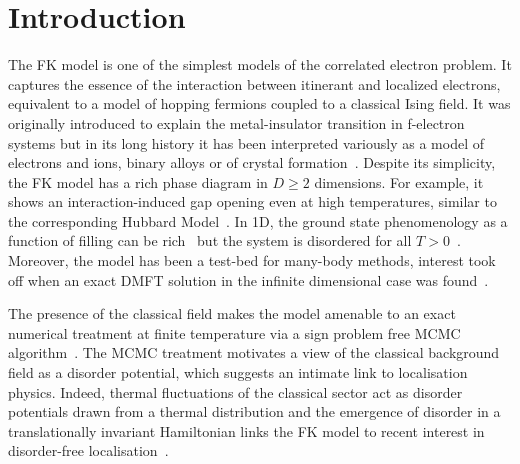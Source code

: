 \section{Introduction}
The \acl{FK} model is one of the simplest models of the correlated electron problem. It captures the essence of the interaction between itinerant and localized electrons, equivalent to a model of hopping fermions coupled to a classical Ising field. It was originally introduced to explain the metal-insulator transition in f-electron systems but in its long history it has been interpreted variously as a model of electrons and ions, binary alloys or of crystal formation~\cite{hubbardj.ElectronCorrelationsNarrow1963, falicovSimpleModelSemiconductorMetal1969,gruberFalicovKimballModelReview1996,gruberFalicovKimballModel2006}. Despite its simplicity, the \ac{FK} model has a rich phase diagram in \(D \geq 2\) dimensions. For example, it shows an interaction-induced gap opening even at high temperatures, similar to the corresponding Hubbard Model~\cite{brandtThermodynamicsCorrelationFunctions1989}.  In 1D, the ground state phenomenology as a function of filling can be rich~\cite{gruberGroundStatesSpinless1990} but the system is disordered for all \(T > 0\)~\cite{kennedyItinerantElectronModel1986}. Moreover, the model has been a test-bed for many-body methods, interest took off when an exact DMFT solution in the infinite dimensional case was found~\cite{antipovCriticalExponentsStrongly2014,ribicNonlocalCorrelationsSpectral2016,freericksExactDynamicalMeanfield2003,herrmannNonequilibriumDynamicalCluster2016}. 

The presence of the classical field makes the model amenable to an exact numerical treatment at finite temperature via a sign problem free \ac{MCMC} algorithm~\cite{devriesGapsDensitiesStates1993,devriesSimplifiedHubbardModel1993,antipovInteractionTunedAndersonMott2016,debskiPossibilityDetectionFinite2016,herrmannSpreadingCorrelationsFalicovKimball2018,maskaThermodynamicsTwodimensionalFalicovKimball2006}. The \ac{MCMC} treatment motivates a view of the classical background field as a disorder potential, which suggests an intimate link to localisation physics. Indeed, thermal fluctuations of the classical sector act as disorder potentials drawn from a thermal distribution and the emergence of disorder in a translationally invariant Hamiltonian links the \ac{FK} model to recent interest in disorder-free localisation~\cite{smithDisorderFreeLocalization2017,smithDynamicalLocalizationMathbbZ2018,brenesManyBodyLocalizationDynamics2018}.

